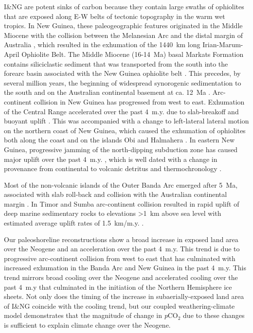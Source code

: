\documentclass[11pt,letterpaper]{article}
\newcommand{\pCOtwo}{\textit{p}CO$_{2}$\xspace}
\begin{document}
I\&NG are potent sinks of carbon because they contain large swaths of ophiolites that are exposed along E-W belts of tectonic topography in the warm wet tropics. In New Guinea, these paleogeographic features originated in the Middle Miocene with the collision between the Melanesian Arc and the distal margin of Australia \citep{vanUfford2005a, Cloos2005a, Baldwin2012a}, which resulted in the exhumation of the 1440~km long Irian-Marum-April Ophiolite Belt. The Middle Miocene (16-14~Ma) basal Markats Formation contains siliciclastic sediment that was transported from the south into the forearc basin associated with the New Guinea ophiolite belt \citep{Cloos2005a}. This precedes, by several million years, the beginning of widespread synorogenic sedimentation to the south and on the Australian continental basement at ca. 12~Ma \citep{vanUfford2005a}. Arc-continent collision in New Guinea has progressed from west to east. Exhumation of the Central Range accelerated over the past 4~m.y. due to slab-breakoff and buoyant uplift \citep{Cloos2005a}. This was accompanied with a change to left-lateral lateral motion on the northern coast of New Guinea, which caused the exhumation of  ophiolites both along the coast and on the islands Obi and Halmahera \citep{Baldwin2012a}. In eastern New Guinea, progressive jamming of the north-dipping subduction zone has caused major uplift over the past 4~m.y. \citep{vanUfford2005a}, which is well dated with a change in provenance from continental to volcanic detritus \citep{Abbott1994a} and thermochronology \citep{Hill1989a}. 

Most of the non-volcanic islands of the Outer Banda Arc emerged after 5~Ma, associated with slab roll-back and collision with the Australian continental margin \citep{Harris2006a, Hall2013a}. In Timor and Sumba arc-continent collision resulted in rapid uplift of deep marine sedimentary rocks to elevations \textgreater1~km above sea level with estimated average uplift rates of 1.5~km/m.y. \citep{AudleyCharles1986a}.

Our paleoshoreline reconstructions show a broad increase in exposed land area over the Neogene and an acceleration over the past 4~m.y. This trend is due to progressive arc-continent collision from west to east that has culminated with increased exhumation in the Banda Arc and New Guinea in the past 4~m.y. This trend mirrors broad cooling over the Neogene and accelerated cooling over the past 4~m.y that culminated in the initiation of the Northern Hemisphere ice sheets. Not only does the timing of the increase in subaerially-exposed land area of I\&NG coincide with the cooling trend, but our coupled weathering-climate model demonstrates that the magnitude of change in \pCOtwo due to these changes is sufficient to explain climate change over the Neogene.
\end{document}
